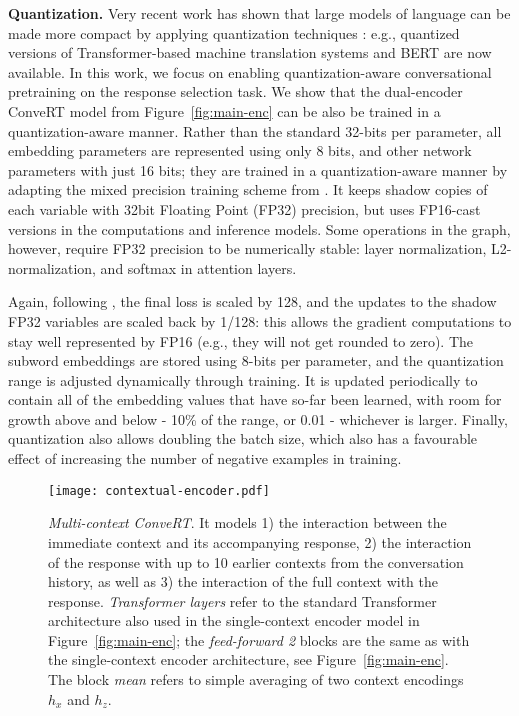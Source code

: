 \documentclass[11pt,a4paper]{article}
\begin{document}
\vspace{1.3mm}
\noindent \textbf{Quantization.}
Very recent work has shown that large models of language can be made more compact by applying quantization techniques \cite{Han:2016iclr}: e.g., quantized versions of Transformer-based machine translation systems \cite{Bhandare:2019arxiv} and BERT \cite{Shen:2019arxiv,Zhao:2019arxiv,Zafrir:2019arxiv} are now available. In this work, we focus on enabling quantization-aware conversational pretraining on the response selection task. We show that the dual-encoder ConveRT model from Figure~\ref{fig:main-enc} can be also be trained in a quantization-aware manner. Rather than the standard 32-bits per parameter, all embedding parameters are represented using only 8 bits, and other network parameters with just 16 bits; they are trained in a quantization-aware manner by adapting the mixed precision training scheme from . It keeps shadow copies of each variable with 32bit Floating Point (FP32) precision, but uses FP16-cast versions in the computations and inference models. Some operations in the graph, however, require FP32 precision to be numerically stable: layer normalization, L2-normalization, and softmax in attention layers.

Again, following , the final loss is scaled by 128, and the updates to the shadow FP32 variables are scaled back by 1/128: this allows the gradient computations to stay well represented by FP16 (e.g., they will not get rounded to zero). The subword embeddings are stored using 8-bits per parameter, and the quantization range is adjusted dynamically through training. It is updated periodically to contain all of the embedding values that have so-far been learned, with room for growth above and below - 10\% of the range, or 0.01 - whichever is larger. Finally, quantization also allows doubling the batch size, which also has a favourable effect of increasing the number of negative examples in training. 




\begin{figure}[!t]
\centering
\texttt{[image: contextual-encoder.pdf]}
\vspace{-1.5mm}
\caption{\textit{Multi-context ConveRT}. It models 1) the interaction between the immediate context and its accompanying response, 2) the interaction of the response with up to 10 earlier contexts from the conversation history, as well as 3) the interaction of the full context with the response. \textit{Transformer layers} refer to the standard Transformer architecture also used in the single-context encoder model in Figure~\ref{fig:main-enc}; the \textit{feed-forward 2} blocks are the same as with the single-context encoder architecture, see Figure~\ref{fig:main-enc}. The block \textit{mean} refers to simple averaging of two context encodings $h_x$ and $h_z$.}
\vspace{-1.5mm}
\label{fig:multi-enc}
\end{figure}
\end{document}
